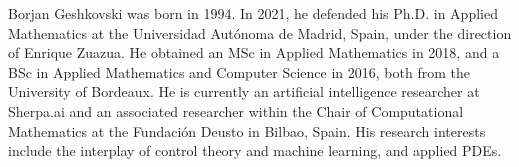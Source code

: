 \documentclass[journal,twoside,web]{ieeecolor}
\begin{document}
\begin{IEEEbiography}{Borjan Geshkovski} was born in 1994. In 2021, he defended his Ph.D. in Applied Mathematics at the Universidad Autónoma de Madrid, Spain, under the direction of Enrique Zuazua. He obtained an MSc in Applied Mathematics in 2018, and a BSc in Applied Mathematics and Computer Science in 2016, both from the University of Bordeaux. He is currently an artificial intelligence researcher at Sherpa.ai and an associated researcher within the Chair of Computational Mathematics at the Fundación Deusto in Bilbao, Spain. His research interests include the interplay of control theory and machine learning, and applied PDEs.
\end{IEEEbiography}
\end{document}
